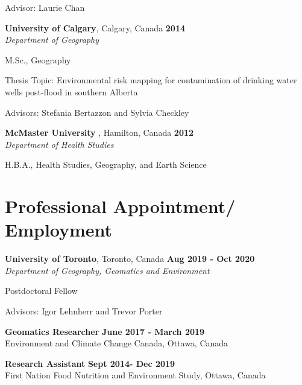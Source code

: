 \documentclass[margin,line]{res}
\newenvironment{list1}{
  \begin{list}{\ding{113}}{%
      \setlength{\itemsep}{0in}
      \setlength{\parsep}{0in} \setlength{\parskip}{0in}
      \setlength{\topsep}{0in} \setlength{\partopsep}{0in}
      \setlength{\leftmargin}{0.17in}}}{\end{list}}
\begin{document}
\begin{resume}
\begin{list1}
\item[] Advisor:  Laurie Chan
\end{list1}

{\bf University of Calgary}, Calgary, Canada
 \hfill {\bf 2014}\\
{\em Department of Geography}
\vspace*{.1in}
\begin{list1}
\item[] M.Sc., Geography
\item[] Thesis Topic:  Environmental risk mapping for contamination of drinking water wells post-flood in southern Alberta
\item[] Advisors:  Stefania Bertazzon and Sylvia Checkley
\end{list1}

{\bf McMaster University }, Hamilton, Canada
 \hfill {\bf 2012}\\
{\em Department of Health Studies}
\vspace*{.1in}
\begin{list1}
\item[] H.B.A., Health Studies, Geography, and Earth Science
\end{list1}

\vspace*{.1in}

\section{\sc Professional Appointment/ Employment}
{\bf University of Toronto}, Toronto, Canada
\hfill {\bf Aug 2019 - Oct 2020}\\
{\em Department of Geography, Geomatics and Environment}
\begin{list1}
	\item[] Postdoctoral Fellow
	\item[] Advisors: Igor Lehnherr and Trevor Porter
\end{list1}

{\bf Geomatics Researcher} \hfill {\bf June 2017 - March 2019}\\
Environment and Climate Change Canada, Ottawa, Canada

{\bf Research Assistant} \hfill {\bf Sept 2014- Dec 2019}\\
First Nation Food Nutrition and Environment Study, Ottawa, Canada

\vspace*{.1in}
\vspace*{.1in}
\vspace*{.1in}
\vspace*{.1in}


\end{resume}
\end{document}
